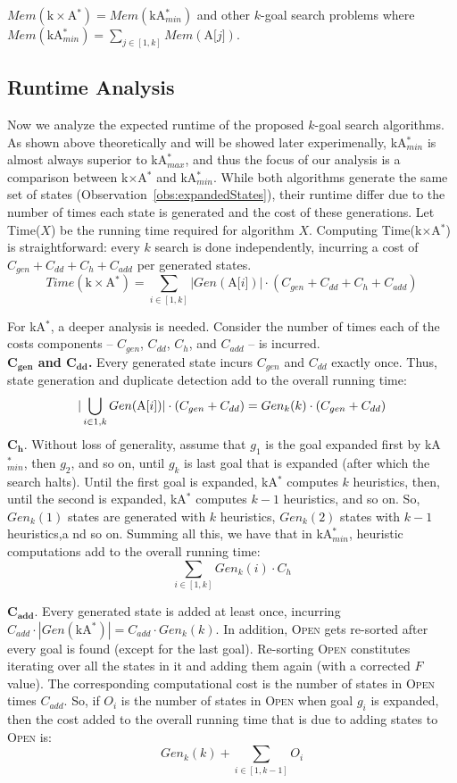 \documentclass{aicom2e}
\newcommand{\kgs}{$k$-goal search}
\newcommand{\kastar}{kA$^*$}
\newcommand{\kastarmin}{kA$^*_{min}$}
\newcommand{\kastarmax}{kA$^*_{max}$}
\newcommand{\kxastar}{k$\times$A$^*$}
\newcommand{\astari}[1]{A[$#1$]}
\newcommand{\open}{\textsc{Open}}
\begin{document}
$Mem(\text{\kxastar{}}) = Mem(\text{\kastarmin{}})$ and other \kgs{} problems where 
$Mem(\text{\kastarmin{}}) = \sum_{j\in[1,k]} Mem(\text{\astari{j}})$. 



\subsection{Runtime Analysis}
Now we analyze the expected runtime of the proposed \kgs{} algorithms. As shown above theoretically 
and will be showed later experimenally, \kastarmin{} is almost always superior to \kastarmax{}, 
and thus the focus of our analysis is a comparison between \kxastar{} and \kastarmin{}. 
While both algorithms generate the same set of states (Observation~\ref{obs:expandedStates}), 
their runtime differ due to the number of times each state is generated and the cost of these generations. 
Let Time($X$) be the running time required for algorithm $X$. 
Computing Time(\kxastar{}) is straightforward: every $k$ search is done independently, incurring a cost of $C_{gen}+C_{dd}+C_h+C_{add}$ per generated states. 
\[ 
Time(\text{\kxastar{}}) = \sum_{i\in[1,k]} |Gen(\text{\astari{i}})|\cdot (C_{gen}+C_{dd}+C_h+C_{add})
\]

For \kastar{}, a deeper analysis is needed. Consider the number of times each of the costs components -- $C_{gen}$, $C_{dd}$, $C_h$, and $C_{add}$ -- is incurred.\\
{\bf $\mathbf{C_{gen}}$ and $\mathbf{C_{dd}}$.} Every generated state incurs $C_{gen}$ and $C_{dd}$ exactly once. 
Thus, state generation and duplicate detection add to the overall running time:
\[ 
|\bigcup_{i\in{1,k}} Gen(\text{\astari{i}})|\cdot (C_{gen}+C_{dd}) = Gen_k(k)\cdot (C_{gen}+C_{dd}) 
\displaystyle
\]
$\mathbf{C_{h}}.$ Without loss of generality, assume that $g_1$ is the goal expanded first by \kastarmin{}, 
then $g_2$, and so on, until $g_k$ is last goal that is expanded (after which the search halts). 
Until the first goal is expanded, \kastar{} computes $k$ heuristics, 
then, until the second is expanded, \kastar{} computes $k-1$ heuristics, and so on. 
So, $Gen_k(1)$ states are generated with $k$ heuristics, 
$Gen_{k}(2)$ states with $k-1$ heuristics,a nd so on. Summing all this, we have that 
in \kastarmin{}, heuristic computations add to the overall running time:
\[ \sum_{i\in[1,k]} Gen_k(i)\cdot C_h \]

$\mathbf{C_{add}}.$ Every generated state is added at least once, 
incurring $C_{add}\cdot |Gen(\text{\kastar{}})|=C_{add}\cdot Gen_k(k)$. 
In addition, \open{} gets re-sorted after every goal is found (except for the last goal). 
Re-sorting \open{} constitutes iterating over all the states in it and adding them again (with a corrected $F$ value). 
The corresponding computational cost is the number of states in \open{} times $C_{add}$. 
So, if $O_i$ is the number of states in \open{} when goal $g_i$ is expanded, then 
the cost added to the overall running time that is due to adding states to \open{} is:
\[ Gen_k(k)+\sum_{i\in[1,k-1]} O_i \]
\end{document}
